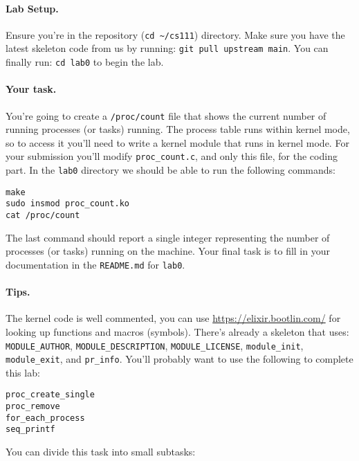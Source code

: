 \paragraph{Lab Setup.}
Ensure you're in the repository (\lstinline|cd ~/cs111|) directory.
Make sure you have the latest skeleton code from us by running:
\lstinline|git pull upstream main|.
You can finally run: \lstinline|cd lab0| to begin the lab.

\paragraph{Your task.}

You're going to create a \lstinline|/proc/count| file that shows the current
number of running processes (or tasks) running.
The process table runs within kernel mode, so to access it you'll need to write
a kernel module that runs in kernel mode.
For your submission you'll modify \lstinline|proc_count.c|, and only this file,
for the coding part.
In the \lstinline|lab0| directory we should be able to run the following
commands:

\begin{lstlisting}[xleftmargin=2em]
make
sudo insmod proc_count.ko
cat /proc/count 
\end{lstlisting}

\noindent
The last command should report a single integer representing the number of
processes (or tasks) running on the machine.
Your final task is to fill in your documentation in the \lstinline|README.md|
for \lstinline|lab0|.

\paragraph{Tips.}

The kernel code is well commented, you can use \url{https://elixir.bootlin.com/}
for looking up functions and macros (symbols). There's already a skeleton that
uses: \lstinline|MODULE_AUTHOR|, \lstinline|MODULE_DESCRIPTION|,
\lstinline|MODULE_LICENSE|, \lstinline|module_init|, \lstinline|module_exit|,
and \lstinline|pr_info|.
You'll probably want to use the following to complete this lab:

\begin{lstlisting}[xleftmargin=2em]
proc_create_single
proc_remove
for_each_process
seq_printf
\end{lstlisting}

\noindent
You can divide this task into small subtasks:

